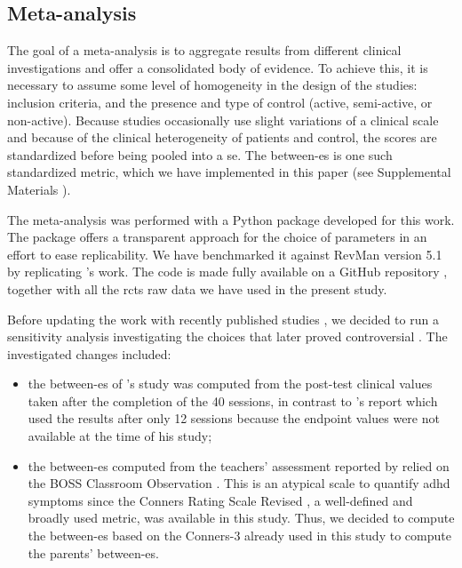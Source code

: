 \subsection{Meta-analysis}

The goal of a meta-analysis is to aggregate results from different clinical investigations and offer a 
consolidated body of evidence. To achieve this, it is necessary to assume 
some level of homogeneity in the design of the studies: inclusion criteria, and the presence and type of control 
(active, semi-active, or non-active). Because studies occasionally 
use slight variations of a clinical scale and because of the clinical heterogeneity of patients and control, 
the scores are standardized before being pooled into a \gls{se}. The between-\gls{es} is one such standardized metric, 
which we have implemented in this paper (see Supplemental Materials \citep{Supplementalmaterial}). 

The meta-analysis was performed with a Python package developed for this work. The package offers a transparent 
approach for the choice of parameters in an effort to ease replicability. We have benchmarked it against RevMan version 5.1 
\citep[UK, London]{RevMan} by replicating \citet{Cortese2016}'s work. 
The code is made fully available on a GitHub repository \citep{Bussalb2019}, together with all the \glspl{rct} raw data we have used
in the present study.
 
Before updating the \citet{Cortese2016} work with recently published studies
\citep{Strehl2017, Baumeister2016}, we decided to run a sensitivity analysis investigating the choices 
that later proved controversial \citep{Micoulaud2016}. The investigated changes included:
\begin{itemize}
\item the between-\gls{es} of \citeauthor{Arnold2014}'s study was computed from the post-test clinical values taken 
after the completion of the 40 sessions, in contrast to \citet{Cortese2016}'s report which used the results 
after only 12 sessions because the endpoint values were not available at the time of his study;
\item the between-\gls{es} computed from the teachers' assessment reported by \citet{Steiner2014} relied on the BOSS 
Classroom Observation \citep{Shapiro2010}. This is an atypical scale to quantify \gls{adhd} symptoms since 
the Conners Rating Scale Revised \citep{Conners1998, Christiansen2014, Bluschke2016}, a well-defined
\citep{Collett2003, Epstein2012} and broadly used metric, was available in this study. Thus, we decided 
to compute the between-\gls{es} based on the Conners-3 already used in this study to compute the 
parents' between-\gls{es}.  
\end{itemize} 


